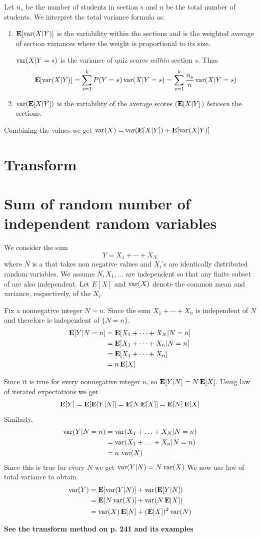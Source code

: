  Let $n_s$ be the number of students in section $s$ and $n$ be the total number of students. We interpret the total variance formula as:
 \begin{enumerate}
     \item $\E[\var(X|Y)]$ is the variability within the sections and is the weighted average of section variances where the weight is proportional to its size.

     $\var(X|Y=s)$ is the variance of quiz scores \textit{within} section $s$. Thus
     \[\E[\var(X|Y)]=\sum_{s=1}^{k}P(Y=s)\var(X|Y=s)=\sum_{s=1}^{k}\frac{n_s}{n}\var(X|Y=s)\]
     \item $\var(\E[X|Y])$ is the variability of the average scores ($\E[X|Y]$) \textit{between} the sections.
 \end{enumerate}

 Combining the values we get $\var(X)=\var(\E[X|Y])+\E[\var(X|Y)]$

 \section{Transform}

 \section{Sum of random number of independent random variables}

 We consider the sum
 \[Y=X_1+\cdots+X_N\]
 where $N$ is a \rv that takes non negative values and $X_i$'s are identically distributed random variables. We assume $N,X_1,\ldots$ are independent so that any finite subset of \rv are also independent. Let $E[X]$ and $\var(X)$ denote the common mean and variance, respectively, of the $X_i$.

 Fix a nonnegative integer $N=n$. Since the sum $X_1+\cdots+X_n$ is independent of $N$ and therefore is independent of $\{N=n\}$.
 \begin{align*}
    \E[Y|N=n] &= \E[X_1+\cdots+X_N|N=n] \\
    &= \E[X_1+\cdots+X_n|N=n] \\
    &= \E[X_1+\cdots+X_n] \\
    &= n\E[X]
 \end{align*}

 Since it is true for every nonnegative integer $n$, so $\E[Y|N]=N\E[X]$. Using law of iterated expectations we get
 \[\E[Y]=\E[\E[Y|N]]=\E[N\E[X]]=\E[N]\E[X]\]
 Similarly,
 \begin{align*}
    \var(Y|N=n) &= \var(X_1+\ldots+X_N|N=n) \\
    &= \var(X_1+\ldots+X_n|N=n) \\
    &= n \, \var(X)
 \end{align*}
 Since this is true for every $N$ we get $\var(Y|N)=N\var(X)$
 We now use law of total variance to obtain
 \begin{align*}
     \var(Y) &= \E[\var(Y|N)] + \var(\E[Y|N]) \\
     &= \E[N\var(X)] + \var(N\E[X]) \\
     &= \var(X)\E[N] + (\E[X])^2\var(N)
 \end{align*}

 \textbf{See the transform method on p. 241 and its examples}